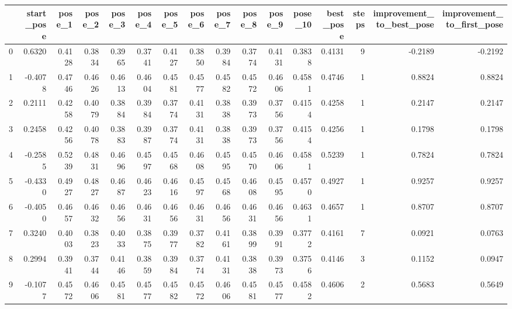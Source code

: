 \begin{tabular}{lrrrrrrrrrrrrrrr}
\toprule
{} &  start\_pose &  pose\_1 &  pose\_2 &  pose\_3 &  pose\_4 &  pose\_5 &  pose\_6 &  pose\_7 &  pose\_8 &  pose\_9 &  pose\_10 &  best\_pose &  steps &  improvement\_to\_best\_pose &  improvement\_to\_first\_pose \\
\midrule
0   &      0.6320 &  0.4128 &  0.3834 &  0.3965 &  0.3741 &  0.4127 &  0.3850 &  0.3984 &  0.3774 &  0.4131 &   0.3838 &     0.4131 &      9 &                   -0.2189 &                    -0.2192 \\
1   &     -0.4078 &  0.4746 &  0.4626 &  0.4613 &  0.4604 &  0.4581 &  0.4577 &  0.4582 &  0.4572 &  0.4606 &   0.4581 &     0.4746 &      1 &                    0.8824 &                     0.8824 \\
2   &      0.2111 &  0.4258 &  0.4079 &  0.3884 &  0.3984 &  0.3774 &  0.4131 &  0.3838 &  0.3973 &  0.3756 &   0.4154 &     0.4258 &      1 &                    0.2147 &                     0.2147 \\
3   &      0.2458 &  0.4256 &  0.4078 &  0.3883 &  0.3987 &  0.3774 &  0.4131 &  0.3838 &  0.3973 &  0.3756 &   0.4154 &     0.4256 &      1 &                    0.1798 &                     0.1798 \\
4   &     -0.2585 &  0.5239 &  0.4831 &  0.4696 &  0.4597 &  0.4568 &  0.4608 &  0.4595 &  0.4570 &  0.4606 &   0.4581 &     0.5239 &      1 &                    0.7824 &                     0.7824 \\
5   &     -0.4330 &  0.4927 &  0.4827 &  0.4687 &  0.4623 &  0.4616 &  0.4597 &  0.4568 &  0.4608 &  0.4595 &   0.4570 &     0.4927 &      1 &                    0.9257 &                     0.9257 \\
6   &     -0.4050 &  0.4657 &  0.4632 &  0.4656 &  0.4631 &  0.4656 &  0.4631 &  0.4656 &  0.4631 &  0.4656 &   0.4631 &     0.4657 &      1 &                    0.8707 &                     0.8707 \\
7   &      0.3240 &  0.4003 &  0.3823 &  0.4033 &  0.3875 &  0.3977 &  0.3782 &  0.4161 &  0.3899 &  0.3991 &   0.3772 &     0.4161 &      7 &                    0.0921 &                     0.0763 \\
8   &      0.2994 &  0.3941 &  0.3744 &  0.4146 &  0.3859 &  0.3984 &  0.3774 &  0.4131 &  0.3838 &  0.3973 &   0.3756 &     0.4146 &      3 &                    0.1152 &                     0.0947 \\
9   &     -0.1077 &  0.4572 &  0.4606 &  0.4581 &  0.4577 &  0.4582 &  0.4572 &  0.4606 &  0.4581 &  0.4577 &   0.4582 &     0.4606 &      2 &                    0.5683 &                     0.5649 \\

\end{tabular}
